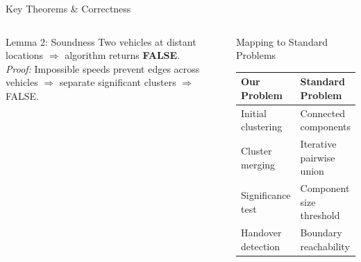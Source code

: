 \documentclass[aspectratio=169,xcolor=dvipsnames,9pt]{beamer}
\begin{document}
\begin{frame}{Key Theorems \& Correctness}
\begin{columns}[T]
        \vspace{0.15em}
        \begin{block}{Lemma 2: Soundness}
            \footnotesize Two vehicles at distant locations $\Rightarrow$ algorithm returns \textbf{FALSE}.\\
            {\scriptsize\textit{Proof:} Impossible speeds prevent edges across vehicles $\Rightarrow$ separate significant clusters $\Rightarrow$ FALSE.}
        \end{block}

        \vspace{0.15em}
        \begin{block}{Mapping to Standard Problems}
            \scriptsize
            \begin{tabular}{ll}
                \toprule
                \textbf{Our Problem} & \textbf{Standard Problem} \\
                \midrule
                Initial clustering & Connected components \\
                Cluster merging & Iterative pairwise union \\
                Significance test & Component size threshold \\
                Handover detection & Boundary reachability \\
                \bottomrule
            \end{tabular}
        \end{block}
    \end{columns}
\end{frame}
\end{document}
